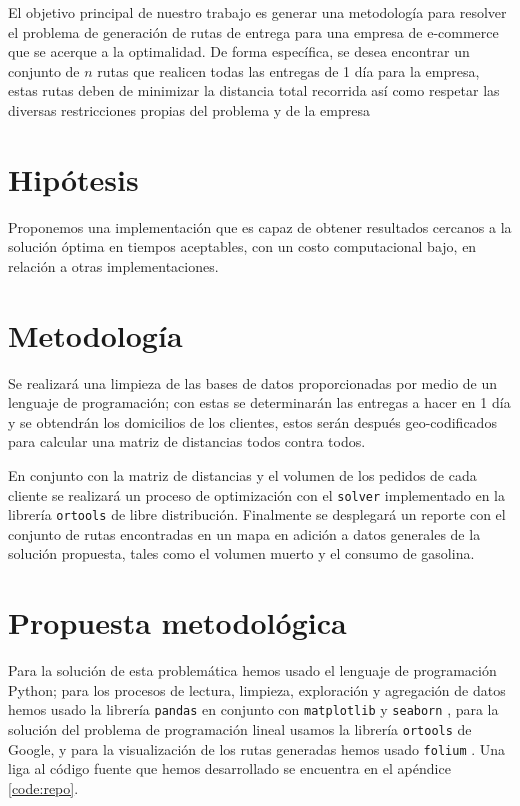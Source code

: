 \documentclass[journal]{IEEEtran}
\begin{document}
        El objetivo principal de nuestro trabajo es generar una metodología para resolver el problema de generación de rutas de entrega para una empresa de e-commerce que se acerque a la optimalidad. De forma específica, se desea encontrar un conjunto de $n$ rutas que realicen todas las entregas de 1 día para la empresa, estas rutas deben de minimizar la distancia total recorrida así como respetar las diversas restricciones propias del problema y de la empresa

    \section{Hipótesis} \label{sec:hyp}
            
        Proponemos una implementación que es capaz de obtener resultados cercanos a la solución óptima en tiempos aceptables, con un costo computacional bajo, en relación a otras implementaciones. 
    
    \section{Metodología} \label{sec:method}

        Se realizará una limpieza de las bases de datos proporcionadas por medio de un lenguaje de programación; con estas se determinarán las entregas a hacer en 1 día y se obtendrán los domicilios de los clientes, estos serán después geo-codificados para calcular una matriz de distancias todos contra todos.

        En conjunto con la matriz de distancias y el volumen de los pedidos de cada cliente se realizará un proceso de optimización con el \texttt{solver} implementado en la librería \texttt{ortools} \cite{google-2021} de libre distribución. Finalmente se desplegará un reporte con el conjunto de rutas encontradas en un mapa en adición a datos generales de la solución propuesta, tales como el volumen muerto y el consumo de gasolina.

    \section{Propuesta metodológica} \label{sec:prop-method}
    
        Para la solución de esta problemática hemos usado el lenguaje de programación Python; para los procesos de lectura, limpieza, exploración y agregación de datos hemos usado la librería \texttt{pandas} \cite{mckinney-proc-scipy-2010} en conjunto con \texttt{matplotlib} \cite{Hunter:2007} y \texttt{seaborn} \cite{Waskom2021}, para la solución del problema de programación lineal usamos la librería \texttt{ortools} \cite{ortools} de Google, y para la visualización de los rutas generadas hemos usado \texttt{folium} \cite{folium}. Una liga al código fuente que hemos desarrollado se encuentra en el apéndice \ref{code:repo}.
        
\end{document}
